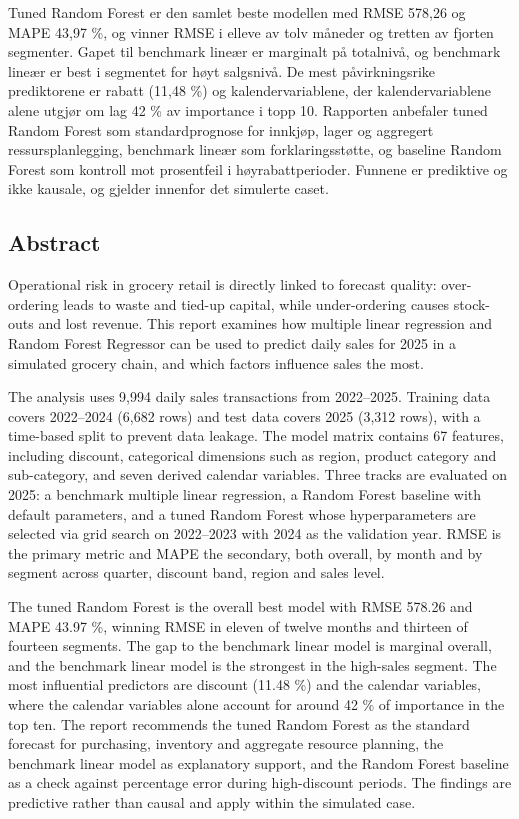 \documentclass[
  11pt,
]{article}
\begin{document}
Tuned Random Forest er den samlet beste modellen med RMSE 578,26 og MAPE 43,97 \%, og vinner RMSE i elleve av tolv
måneder og tretten av fjorten segmenter. Gapet til benchmark lineær er marginalt på totalnivå, og benchmark lineær er
best i segmentet for høyt salgsnivå. De mest påvirkningsrike prediktorene er rabatt (11,48 \%) og kalendervariablene,
der kalendervariablene alene utgjør om lag 42 \% av importance i topp 10. Rapporten anbefaler tuned Random Forest som
standardprognose for innkjøp, lager og aggregert ressursplanlegging, benchmark lineær som forklaringsstøtte, og baseline
Random Forest som kontroll mot prosentfeil i høyrabattperioder. Funnene er prediktive og ikke kausale, og gjelder
innenfor det simulerte caset.

\hypertarget{abstract}{%
\subsection{\texorpdfstring{Abstract }{Abstract }}\label{abstract}}

Operational risk in grocery retail is directly linked to forecast quality: over-ordering leads to waste and tied-up
capital, while under-ordering causes stock-outs and lost revenue. This report examines how multiple linear regression
and Random Forest Regressor can be used to predict daily sales for 2025 in a simulated grocery chain, and which factors
influence sales the most.

The analysis uses 9,994 daily sales transactions from 2022--2025. Training data covers 2022--2024 (6,682 rows) and test
data covers 2025 (3,312 rows), with a time-based split to prevent data leakage. The model matrix contains 67 features,
including discount, categorical dimensions such as region, product category and sub-category, and seven derived calendar
variables. Three tracks are evaluated on 2025: a benchmark multiple linear regression, a Random Forest baseline with
default parameters, and a tuned Random Forest whose hyperparameters are selected via grid search on 2022--2023 with 2024
as the validation year. RMSE is the primary metric and MAPE the secondary, both overall, by month and by segment across
quarter, discount band, region and sales level.

The tuned Random Forest is the overall best model with RMSE 578.26 and MAPE 43.97 \%, winning RMSE in eleven of twelve
months and thirteen of fourteen segments. The gap to the benchmark linear model is marginal overall, and the benchmark
linear model is the strongest in the high-sales segment. The most influential predictors are discount (11.48 \%) and the
calendar variables, where the calendar variables alone account for around 42 \% of importance in the top ten. The report
recommends the tuned Random Forest as the standard forecast for purchasing, inventory and aggregate resource planning,
the benchmark linear model as explanatory support, and the Random Forest baseline as a check against percentage error
during high-discount periods. The findings are predictive rather than causal and apply within the simulated case.
\end{document}
